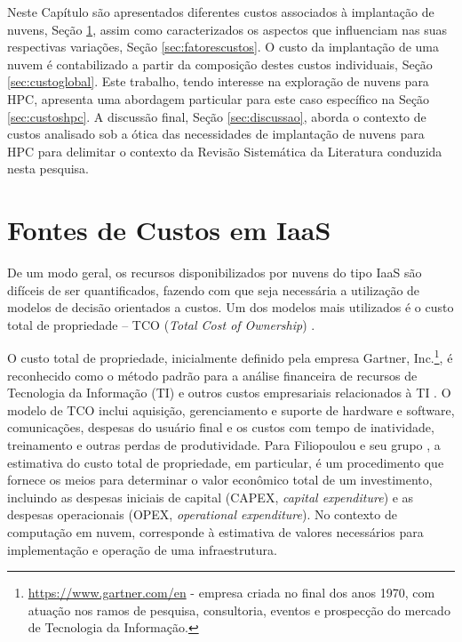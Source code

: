 \documentclass[tese,capa]{texufpel}
\begin{document}
Neste Capítulo são apresentados diferentes custos associados à implantação de nuvens, Seção \ref{sec:fontescustos}, assim como caracterizados os aspectos que influenciam nas suas respectivas variações, Seção \ref{sec:fatorescustos}. O custo da implantação de uma nuvem é contabilizado a partir da composição destes custos individuais, Seção \ref{sec:custoglobal}. Este trabalho, tendo interesse na exploração de nuvens para HPC, apresenta uma abordagem particular para este caso específico na Seção \ref{sec:custoshpc}. A discussão final, Seção \ref{sec:discussao}, aborda o contexto de custos analisado sob a ótica das necessidades de implantação de nuvens para HPC para delimitar o contexto da Revisão Sistemática da Literatura conduzida nesta pesquisa.

\section{Fontes de Custos em IaaS}\label{sec:fontescustos}
De um modo geral, os recursos disponibilizados por nuvens do tipo IaaS são difíceis de ser quantificados, fazendo com que seja necessária a utilização de modelos de decisão orientados a custos. Um dos modelos mais utilizados é o custo total de propriedade -- TCO (\emph{Total Cost of Ownership}) \cite{strebelEconomicDecisionModel2010}.

O custo total de propriedade, inicialmente definido pela empresa Gartner, Inc.\footnote{\url{https://www.gartner.com/en} - empresa criada no final dos anos 1970, com atuação nos ramos de pesquisa, consultoria, eventos e prospecção do mercado de Tecnologia da Informação.}, é reconhecido como o método padrão para a análise financeira de recursos de Tecnologia da Informação (TI) e outros custos empresariais relacionados à TI \cite{mieritzDefiningGartnerTotal2005}. O modelo de TCO inclui aquisição, gerenciamento e suporte de hardware e software, comunicações, despesas do usuário final e os custos com tempo de inatividade, treinamento e outras perdas de produtividade. Para Filiopoulou e seu grupo \cite{filiopoulouIntegratingCostAnalysis2015}, a estimativa do custo total de propriedade, em particular, é um procedimento que fornece os meios para determinar o valor econômico total de um investimento, incluindo as despesas iniciais de capital (CAPEX, \emph{capital expenditure}) e as despesas operacionais (OPEX, \emph{operational expenditure}). No contexto de computação em nuvem, corresponde à estimativa de valores necessários para implementação e operação de uma infraestrutura.
\end{document}
